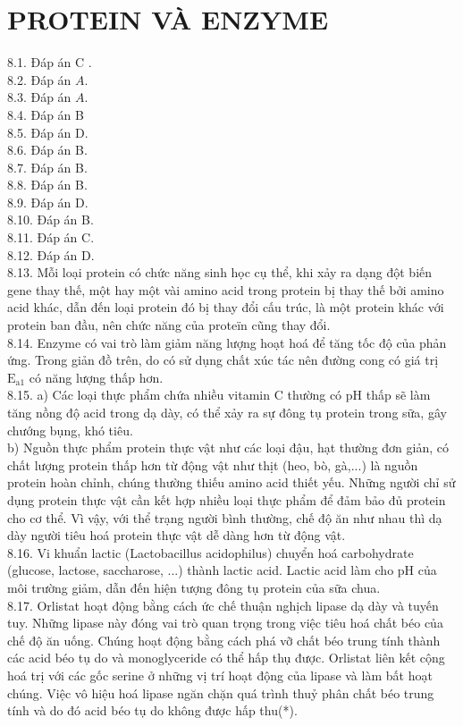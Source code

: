 \documentclass[10pt]{article}
\begin{document}
\section*{PROTEIN VÀ ENZYME}
8.1. Đáp án C .\\
8.2. Đáp án $A$.\\
8.3. Đáp án $A$.\\
8.4. Đáp án B\\
8.5. Đáp án D.\\
8.6. Đáp án B.\\
8.7. Đáp án B.\\
8.8. Đáp án B.\\
8.9. Đáp án D.\\
8.10. Đáp án B.\\
8.11. Đáp án C.\\
8.12. Đáp án D.\\
8.13. Mỗi loại protein có chức năng sinh học cụ thể, khi xảy ra dạng đột biến gene thay thế, một hay một vài amino acid trong protein bị thay thế bởi amino acid khác, dẫn đến loại protein đó bị thay đổi cấu trúc, là một protein khác với protein ban đầu, nên chức năng của proteïn cũng thay đổi.\\
8.14. Enzyme có vai trò làm giảm năng lượng hoạt hoá để tăng tốc độ của phản ứng. Trong giản đồ trên, do có sử dụng chất xúc tác nên đường cong có giá trị $\mathrm{E}_{\mathrm{a} 1}$ có năng lượng thấp hơn.\\
8.15. a) Các loại thực phẩm chứa nhiều vitamin C thường có pH thấp sẽ làm tăng nồng độ acid trong dạ dày, có thể xảy ra sự đông tụ protein trong sữa, gây chướng bụng, khó tiêu.\\
b) Nguồn thực phẩm protein thực vật như các loại đậu, hạt thường đơn giản, có chất lượng protein thấp hơn từ động vật như thịt (heo, bò, gà,...) là nguồn protein hoàn chỉnh, chúng thường thiếu amino acid thiết yếu. Những người chỉ sử dụng protein thực vật cần kết hợp nhiều loại thực phẩm để đảm bảo đủ protein cho cơ thể. Vì vậy, với thể trạng người bình thường, chế độ ăn như nhau thì dạ dày người tiêu hoá protein thực vật dễ dàng hơn từ động vật.\\
8.16. Vi khuẩn lactic (Lactobacillus acidophilus) chuyển hoá carbohydrate (glucose, lactose, saccharose, ...) thành lactic acid. Lactic acid làm cho pH của môi trường giảm, dẫn đến hiện tượng đông tụ protein của sữa chua.\\
8.17. Orlistat hoạt động bằng cách ức chế thuận nghịch lipase dạ dày và tuyến tuy. Những lipase này đóng vai trò quan trọng trong việc tiêu hoá chất béo của chế độ ăn uống. Chúng hoạt động bằng cách phá vỡ chất béo trung tính thành các acid béo tụ do và monoglyceride có thể hấp thụ được. Orlistat liên kết cộng hoá trị với các gốc serine ở những vị trí hoạt động của lipase và làm bất hoạt chúng. Việc vô hiệu hoá lipase ngăn chặn quá trình thuỷ phân chất béo trung tính và do đó acid béo tụ do không được hấp thu(*).\\
\end{document}
